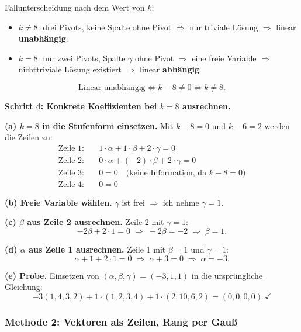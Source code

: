 \documentclass[a4paper,12pt]{article}
\begin{document}
Fallunterscheidung nach dem Wert von $k$:

\begin{itemize}[leftmargin=*, nosep]
\item $k \neq 8$: drei Pivots, keine Spalte ohne Pivot $\Rightarrow$ nur triviale L\"osung $\Rightarrow$ linear \textbf{unabh\"angig}.
\item $k = 8$: nur zwei Pivots, Spalte $\gamma$ ohne Pivot $\Rightarrow$ eine freie Variable $\Rightarrow$ nichttriviale L\"osung existiert $\Rightarrow$ linear \textbf{abh\"angig}.
\end{itemize}

\[
\text{Linear unabh\"angig} \iff k - 8 \neq 0 \iff k \neq 8.
\]

\textbf{Schritt 4: Konkrete Koeffizienten bei $k = 8$ ausrechnen.}

\textbf{(a) $k = 8$ in die Stufenform einsetzen.} Mit $k - 8 = 0$ und $k - 6 = 2$ werden die Zeilen zu:
\begin{align*}
\text{Zeile 1:} &\quad 1 \cdot \alpha + 1 \cdot \beta + 2 \cdot \gamma = 0 \\
\text{Zeile 2:} &\quad 0 \cdot \alpha + (-2) \cdot \beta + 2 \cdot \gamma = 0 \\
\text{Zeile 3:} &\quad 0 = 0 \quad \text{(keine Information, da $k-8 = 0$)} \\
\text{Zeile 4:} &\quad 0 = 0
\end{align*}

\textbf{(b) Freie Variable w\"ahlen.} $\gamma$ ist frei $\Rightarrow$ ich nehme $\gamma = 1$.

\textbf{(c) $\beta$ aus Zeile 2 ausrechnen.} Zeile 2 mit $\gamma = 1$:
\[
-2\beta + 2 \cdot 1 = 0 \;\Rightarrow\; -2\beta = -2 \;\Rightarrow\; \beta = 1.
\]

\textbf{(d) $\alpha$ aus Zeile 1 ausrechnen.} Zeile 1 mit $\beta = 1$ und $\gamma = 1$:
\[
\alpha + 1 + 2 \cdot 1 = 0 \;\Rightarrow\; \alpha + 3 = 0 \;\Rightarrow\; \alpha = -3.
\]

\textbf{(e) Probe.} Einsetzen von $(\alpha, \beta, \gamma) = (-3, 1, 1)$ in die urspr\"ungliche Gleichung:
\[
-3(1,4,3,2) + 1 \cdot (1,2,3,4) + 1 \cdot (2,10,6,2) = (0,0,0,0) \;\checkmark
\]

\bigskip

\subsubsection*{Methode 2: Vektoren als Zeilen, Rang per Gau\ss{}}
\end{document}

